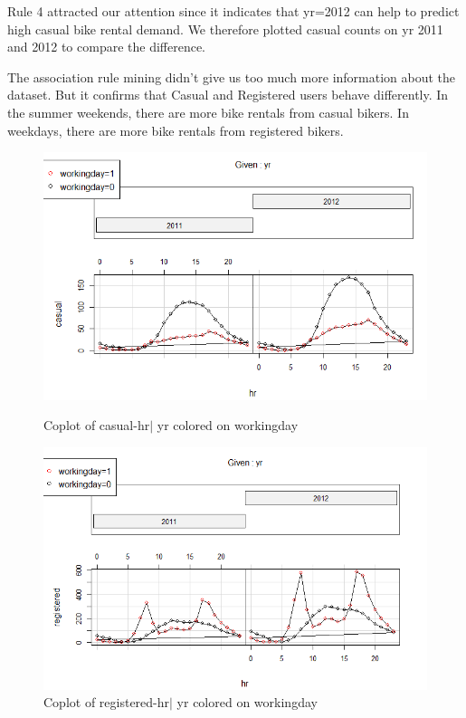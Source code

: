 \documentclass[12pt]{article}
\begin{document}
	Rule 4 attracted our attention since it indicates that yr=2012 can help to predict high casual bike rental demand. We therefore plotted casual counts on yr 2011 and 2012 to compare the difference. 
	
	The association rule mining didn't give us too much more information about the dataset. But it confirms that Casual and Registered users behave differently. In the summer weekends, there are more bike rentals from casual bikers. In weekdays, there are more bike rentals from registered bikers. 
	
	\begin{figure}[H]
		\centering
		\begin{minipage}{.48\textwidth}
			\centering
			\includegraphics[width=\linewidth]{figures/casual_yr.png}
			\caption{Coplot of casual-hr$|$ yr colored on workingday}
		\end{minipage}%
		\begin{minipage}{.48\textwidth}
			\centering
			\includegraphics[width=\linewidth]{figures/registered_yr.png}
			\caption{Coplot of registered-hr$|$ yr colored on workingday}
		\end{minipage}
	\end{figure}
	
\end{document}
